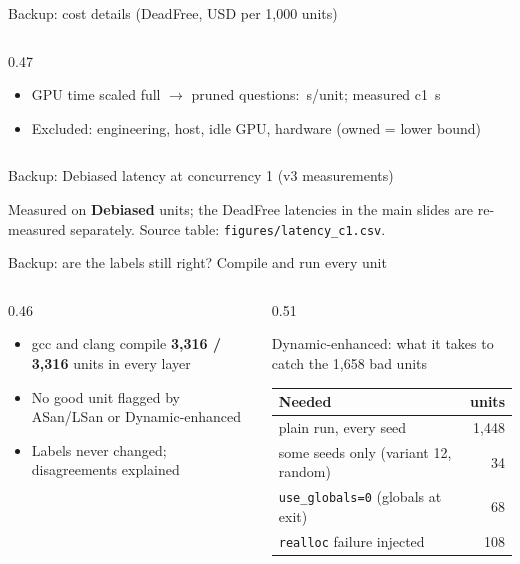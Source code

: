 \begin{frame}{Backup: cost details (DeadFree, USD per 1,000 units)}
\begin{columns}[T]
\begin{column}{0.47\textwidth}
\begin{itemize}
        \item GPU time scaled full $\to$ pruned questions: \,s/unit; measured c1 \,s
        \item Excluded: engineering, host, idle GPU, hardware (owned = lower bound)
      \end{itemize}
    \end{column}
  \end{columns}
\end{frame}

\begin{frame}{Backup: Debiased latency at concurrency 1 (v3 measurements)}
  \centering
  {\tiny\renewcommand{\arraystretch}{0.92}\resizebox{\linewidth}{!}{}\par}
  \vfill
  {\scriptsize Measured on \textbf{Debiased} units; the DeadFree latencies in the main slides are re-measured separately.
  Source table: \texttt{figures/latency\_c1.csv}.\par}
\end{frame}

\begin{frame}{Backup: are the labels still right? Compile and run every unit}
  \begin{columns}[T]
    \begin{column}{0.46\textwidth}
      \begin{itemize}\small
        \item gcc and clang compile \textbf{3,316 / 3,316} units in every layer
        \item No good unit flagged by ASan/LSan or Dynamic-enhanced
        \item Labels never changed; disagreements explained
      \end{itemize}
    \end{column}
    \begin{column}{0.51\textwidth}
      {\footnotesize Dynamic-enhanced: what it takes to catch the 1,658 bad units\\[2pt]
      \begin{tabular}{@{}lr@{}}
        \toprule
        Needed & units \\
        \midrule
        plain run, every seed & 1,448 \\
        some seeds only (variant 12, random) & 34 \\
        \texttt{use\_globals=0} (globals at exit) & 68 \\
        \texttt{realloc} failure injected & 108 \\
        \bottomrule
      \end{tabular}}
    \end{column}
  \end{columns}
\end{frame}


